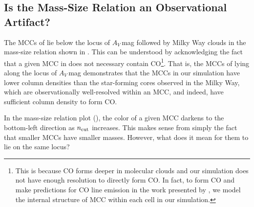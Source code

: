 \IfFileExists{emulateapjlegacy.cls}{\documentclass[iop]{emulateapjlegacy}}{\documentclass[iop]{emulateapj}}
\begin{document}
\subsection{Is the Mass-Size Relation an Observational Artifact?} \label{sec:MR}
The MCCs of \flower lie below the locus of $A_V$\,mag followed
by Milky Way clouds in the mass-size relation shown in . This
can be understood by acknowledging the fact that a given MCC in \flower 
does not necessary contain CO\footnote{This is because CO forms deeper in molecular clouds and 
our simulation does not have enough resolution to directly form CO. In fact, to form CO and make
predictions for CO line emission in the work presented by 
\citet{Vallini18a}, we model the internal structure of MCC within each cell in our simulation.}.
That is, the MCCs of \flower lying along the locus of $A_V$\,mag demonstrates
that the MCCs in our simulation have lower column densities than the
star-forming cores observed in the Milky Way, which are
observationally well-resolved within an MCC, and indeed, have
sufficient column density to form CO. 

In the mass-size relation plot (), the color of a given MCC darkens to the bottom-left direction as $n_{\rm cut}$ increases. 
This makes sense from simply the fact that smaller MCCs have smaller masses. 
However, what does it mean for them to lie on the same locus?
\end{document}
